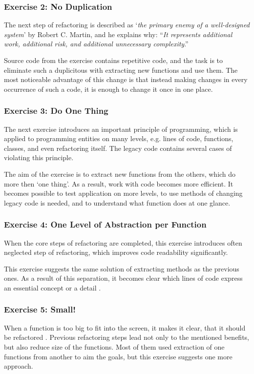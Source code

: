     \subsubsection{Exercise 2: No Duplication}
    The next step of refactoring is described as `\textit{the primary enemy of a well-designed system}' by Robert C. Martin, and he explains why: ``\textit{It represents additional work, additional risk, and additional unnecessary complexity}\cite[No Duplication]{clean_code}.''
    
    Source code from the exercise contains repetitive code, and the task is to eliminate such a duplicitous with extracting new functions and use them. The most noticeable advantage of this change is that instead making changes in every occurrence of such a code, it is enough to change it once in one place.
    
    \subsubsection{Exercise 3: Do One Thing}
    The next exercise introduces an important principle of programming, which is applied to programming entities on many levels, e.g. lines of code, functions, classes, and even refactoring itself. The legacy code contains several cases of violating this principle\cite[Do One Thing]{clean_code}.
    
    The aim of the exercise is to extract new functions from the others, which do more then `one thing'. As a result, work with code becomes more efficient. It becomes possible to test application on more levels, to use methods of changing legacy code is needed, and to understand what function does at one glance.
    
    \subsubsection{Exercise 4: One Level of Abstraction per Function}
    When the core steps of refactoring are completed, this exercise introduces often neglected step of refactoring, which improves code readability significantly.
    
    This exercise suggests the same solution of extracting methods as the previous ones. As a result of this separation, it becomes clear which lines of code express an essential concept or a detail \cite[One Level of Abstraction per Function]{clean_code}.
    
    \subsubsection{Exercise 5: Small!}
    When a function is too big to fit into the screen, it makes it clear, that it should be refactored \cite[Small!]{clean_code}. Previous refactoring steps lead not only to the mentioned benefits, but also reduce size of the functions. Most of them used extraction of one functions from another to aim the goals, but this exercise suggests one more approach.
    
